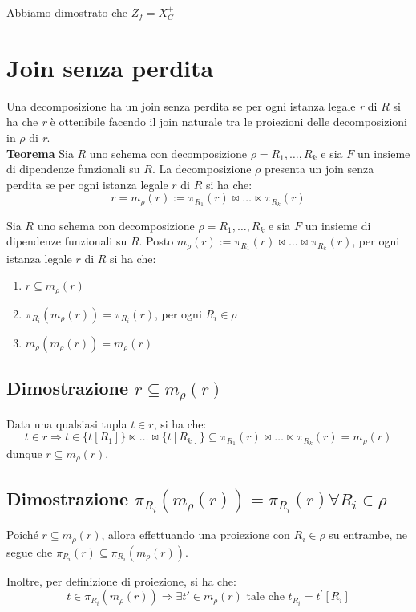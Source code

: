 \documentclass{article}
\begin{document}
Abbiamo dimostrato che \textbf{$Z_f = X_G^+$}


\pagebreak
\section{Join senza perdita}
Una decomposizione ha un join senza perdita se per ogni istanza legale \textit{r} di $R$ si ha che \textit{r} è ottenibile facendo il join naturale tra le proiezioni delle decomposizioni in $\rho$ di \textit{r}.
\\

\textbf{Teorema}
Sia $R$ uno schema con decomposizione $\rho = R_1, \ldots, R_k$ e sia $F$ un insieme di dipendenze funzionali su $R$. La decomposizione $\rho$ presenta un join senza perdita se per ogni istanza legale $r$ di $R$ si ha che:
\[ r = m_{\rho}(r) := \pi_{R_1}(r) \bowtie \ldots \bowtie \pi_{R_k}(r) \]

Sia $R$ uno schema con decomposizione $\rho = R_1, \ldots, R_k$ e sia $F$ un insieme di dipendenze funzionali su $R$. Posto $m_{\rho}(r) := \pi_{R_1}(r) \bowtie \ldots \bowtie \pi_{R_k}(r)$, per ogni istanza legale $r$ di $R$ si ha che:

\begin{enumerate}
  \item $r \subseteq m_{\rho}(r)$
  \item $\pi_{R_i}(m_{\rho}(r)) = \pi_{R_i}(r)$, per ogni $R_i \in \rho$
  \item $m_{\rho}(m_{\rho}(r)) = m_{\rho}(r)$
\end{enumerate}
\subsection{Dimostrazione $r \subseteq m_{\rho}(r)$}
Data una qualsiasi tupla $t \in r$, si ha che:
\[ t \in r \Rightarrow t \in \{t[R_1]\} \bowtie \ldots \bowtie \{t[R_k]\} \subseteq \pi_{R_1}(r) \bowtie \ldots \bowtie \pi_{R_k}(r) = m_{\rho}(r) \]
dunque $r \subseteq m_{\rho}(r)$.
\subsection{Dimostrazione  $\pi_{R_i}(m_{\rho}(r)) = \pi_{R_i}(r) \forall R_i \in \rho$}

Poiché $r \subseteq m_{\rho}(r)$, allora effettuando una proiezione con $R_i \in \rho$ su entrambe, ne segue che $\pi_{R_i}(r) \subseteq \pi_{R_i}(m_{\rho}(r))$.

Inoltre, per definizione di proiezione, si ha che:
\[ t \in \pi_{R_i}(m_{\rho}(r)) \Rightarrow \exists t' \in m_{\rho}(r) \text{ tale che } t_{R_i} = t^{'}[R_i] \]
\end{document}

